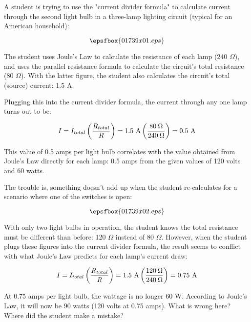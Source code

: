 

A student is trying to use the "current divider formula" to calculate current through the second light bulb in a three-lamp lighting circuit (typical for an American household):

$$\epsfbox{01739x01.eps}$$

The student uses Joule's Law to calculate the resistance of each lamp (240 $\Omega$), and uses the parallel resistance formula to calculate the circuit's total resistance (80 $\Omega$).  With the latter figure, the student also calculates the circuit's total (source) current: 1.5 A.

Plugging this into the current divider formula, the current through any one lamp turns out to be:

$$I = I_{total} \left( {R_{total} \over R} \right) = 1.5 \hbox{ A} \left( {80 \> \Omega \over 240 \> \Omega} \right) = 0.5 \hbox{ A}$$

This value of 0.5 amps per light bulb correlates with the value obtained from Joule's Law directly for each lamp: 0.5 amps from the given values of 120 volts and 60 watts.

The trouble is, something doesn't add up when the student re-calculates for a scenario where one of the switches is open:

$$\epsfbox{01739x02.eps}$$

With only two light bulbs in operation, the student knows the total resistance must be different than before: 120 $\Omega$ instead of 80 $\Omega$.  However, when the student plugs these figures into the current divider formula, the result seems to conflict with what Joule's Law predicts for each lamp's current draw:

$$I = I_{total} \left( {R_{total} \over R} \right) = 1.5 \hbox{ A} \left( {120 \> \Omega \over 240 \> \Omega} \right) = 0.75 \hbox{ A}$$

At 0.75 amps per light bulb, the wattage is no longer 60 W.  According to Joule's Law, it will now be 90 watts (120 volts at 0.75 amps).  What is wrong here?  Where did the student make a mistake?







